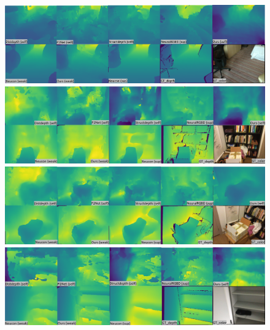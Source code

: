 \newpage
\begin{figure}
\begin{minipage}{\textwidth}
  \centerline{\includegraphics[width=1.0\textwidth]{figures/scannet_depth/738_1300.png}}
\end{minipage}
\vfill
\begin{minipage}{\linewidth}
  \centerline{\includegraphics[width=1.0\textwidth]{figures/scannet_depth/710_1210.png}}
\end{minipage}
\vfill
\begin{minipage}{\linewidth}
  \centerline{\includegraphics[width=1.0\textwidth]{figures/scannet_depth/710_1280.png}}
\end{minipage}
\begin{minipage}{\linewidth}
  \centerline{\includegraphics[width=1.0\textwidth]{figures/scannet_depth/711_880.png}}
\end{minipage}
\end{figure}

